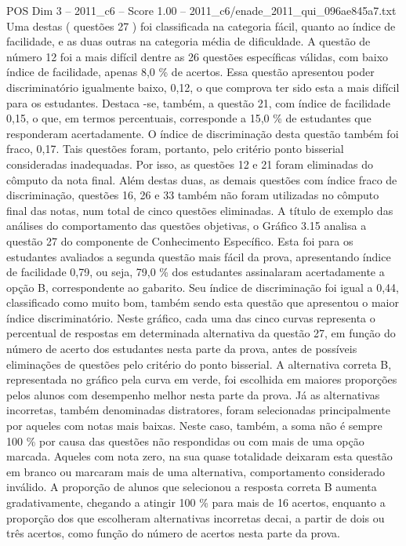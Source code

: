 \begin{textsample}{POS Dim 3 – 2011\_c6 – Score 1.00 – 2011\_c6/enade\_2011\_qui\_096ae845a7.txt}
Uma destas ( questões 27 ) foi classificada na categoria fácil, quanto ao índice de facilidade, e as duas outras na categoria média de dificuldade.
A questão de número 12 foi a mais difícil dentre as 26 questões específicas válidas, com baixo índice de facilidade, apenas 8,0 \% de acertos.
Essa questão apresentou poder discriminatório igualmente baixo, 0,12, o que comprova ter sido esta a mais difícil para os estudantes.
Destaca -se, também, a questão 21, com índice de facilidade 0,15, o que, em termos percentuais, corresponde a 15,0 \% de estudantes que responderam acertadamente.
O índice de discriminação desta questão também foi fraco, 0,17.
Tais questões foram, portanto, pelo critério ponto bisserial consideradas inadequadas.
Por isso, as questões 12 e 21 foram eliminadas do cômputo da nota final.
Além destas duas, as demais questões com índice fraco de discriminação, questões 16, 26 e 33 também não foram utilizadas no cômputo final das notas, num total de cinco questões eliminadas.
A título de exemplo das análises do comportamento das questões objetivas, o Gráfico 3.15 analisa a questão 27 do componente de Conhecimento Específico.
Esta foi para os estudantes avaliados a segunda questão mais fácil da prova, apresentando índice de facilidade 0,79, ou seja, 79,0 \% dos estudantes assinalaram acertadamente a opção B, correspondente ao gabarito.
Seu índice de discriminação foi igual a 0,44, classificado como muito bom, também sendo esta questão que apresentou o maior índice discriminatório.
Neste gráfico, cada uma das cinco curvas representa o percentual de respostas em determinada alternativa da questão 27, em função do número de acerto dos estudantes nesta parte da prova, antes de possíveis eliminações de questões pelo critério do ponto bisserial.
A alternativa correta B, representada no gráfico pela curva em verde, foi escolhida em maiores proporções pelos alunos com desempenho melhor nesta parte da prova.
Já as alternativas incorretas, também denominadas distratores, foram selecionadas principalmente por aqueles com notas mais baixas.
Neste caso, também, a soma não é sempre 100 \% por causa das questões não respondidas ou com mais de uma opção marcada.
Aqueles com nota zero, na sua quase totalidade deixaram esta questão em branco ou marcaram mais de uma alternativa, comportamento considerado inválido.
A proporção de alunos que selecionou a resposta correta B aumenta gradativamente, chegando a atingir 100 \% para mais de 16 acertos, enquanto a proporção dos que escolheram alternativas incorretas decai, a partir de dois ou três acertos, como função do número de acertos nesta parte da prova.

\end{textsample}
